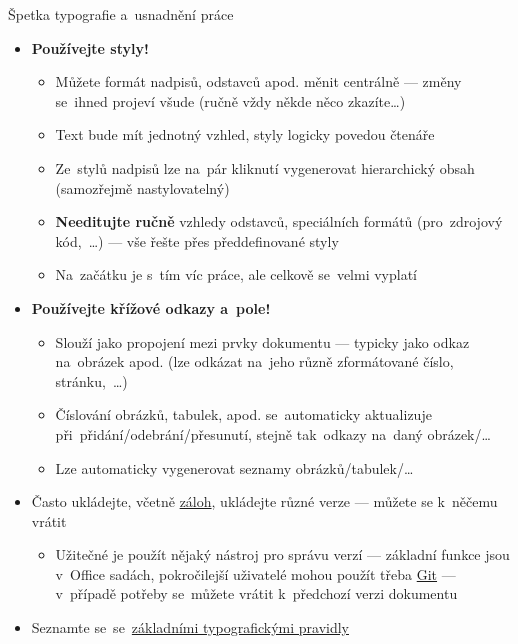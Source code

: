 \documentclass[compress, ucs, xelatex, 11pt, xcolor=svgnames, aspectratio=169,
	hyperref={
		bookmarks=true,
		unicode=true,
		colorlinks=true,
		pdftitle={Citacni software},
		plainpages=false,
		pdfauthor={Vojtech Zeisek},
		pdfsubject={Kratky uvod do citacniho software},
		pdfcreator={XeLaTeX},
		pdfkeywords={citace, reference, software, literatura},
		linkcolor=Crimson, %
		anchorcolor=Magenta, %
		citecolor=Magenta, %
		filecolor=Magenta, %
		menucolor=Magenta, %
		urlcolor=DarkTurquoise, %
		pdftex},
	url={hyphens, lowtilde} %
	]{beamer}
\begin{document}
\begin{frame}[allowframebreaks]{Špetka typografie a~usnadnění práce}
	\begin{itemize}
		\item \textbf{Používejte styly!}
			\begin{itemize}
				\item Můžete formát nadpisů, odstavců apod. měnit centrálně --- změny se~ihned projeví všude (ručně vždy někde něco zkazíte\ldots)
				\item Text bude mít jednotný vzhled, styly logicky povedou čtenáře
				\item Ze~stylů nadpisů lze na~pár kliknutí vygenerovat hierarchický obsah (samozřejmě nastylovatelný)
				\item \textbf{Needitujte ručně} vzhledy odstavců, speciálních formátů (pro~zdrojový kód,~\ldots) --- vše řešte přes předdefinované styly
				\item Na~začátku je s~tím víc práce, ale celkově se~velmi vyplatí
			\end{itemize}
		\item \textbf{Používejte křížové odkazy a~pole!}
			\begin{itemize}
				\item Slouží jako propojení mezi prvky dokumentu --- typicky jako odkaz na~obrázek apod. (lze odkázat na~jeho různě zformátované číslo, stránku,~\ldots)
				\item Číslování obrázků, tabulek, apod. se~automaticky aktualizuje při~přidání/odebrání/přesunutí, stejně tak~odkazy na~daný obrázek/\ldots
				\item Lze automaticky vygenerovat seznamy obrázků/tabulek/\ldots
			\end{itemize}
		\item Často ukládejte, včetně \href{https://www.natur.cuni.cz/biologie/botanika/provozni-informace/servery-weby-a-pocitace/moznosti-zalohovani-dat}{záloh}, ukládejte různé verze --- můžete se k~něčemu vrátit
		\begin{itemize}
			\item Užitečné je použít nějaký nástroj pro správu verzí --- základní funkce jsou v~Office sadách, pokročilejší uživatelé mohou použít třeba \href{https://git-scm.com/book/cs/v2}{Git} --- v~případě potřeby se~můžete vrátit k~předchozí verzi dokumentu
		\end{itemize}
		\item Seznamte se~se~\href{https://duckduckgo.com/?q=typografick\%C3\%A1+pravidla&ia=web}{základními typografickými pravidly}

\end{itemize}
\end{frame}
\end{document}
